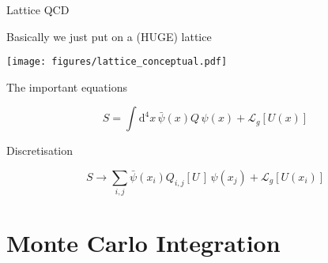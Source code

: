\documentclass[14pt]{beamer}
\begin{document}
\begin{frame}{Lattice QCD}

  Basically we just put on a {\large{}({\color{Marty}HUGE})} lattice

  \begin{center}
    \texttt{[image: figures/lattice\_conceptual.pdf]}
  \end{center}

\end{frame}

\begin{frame}{The important equations}

  \begin{equation*}
    S = \int \mathrm{d}^4 x \, \bar{\psi}(x) Q\, \psi(x) + \mathcal{L}_g[U(x)] \end{equation*}


  \vspace*{-0.2cm}


\end{frame}

\begin{frame}{Discretisation}

  \begin{equation*}
    S \to \sum_{i,j} \bar{\psi}(x_i) Q_{i,j}[U\,]\, \psi(x_j) + \mathcal{L}_g[U(x_i)]
  \end{equation*}


\end{frame}

\section{Monte Carlo Integration}
\frame{\sectionpage}
\end{document}
